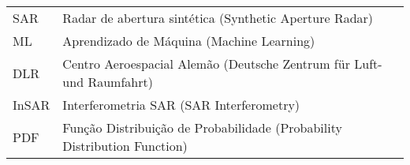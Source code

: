 \begin{longtable}{ll}
SAR	 & 		Radar de abertura sintética (Synthetic Aperture Radar)\\
ML	 & 		Aprendizado de Máquina (Machine Learning)\\
DLR	 & 		Centro Aeroespacial Alemão (Deutsche Zentrum für Luft- und Raumfahrt)\\
InSAR	 & 		Interferometria SAR (SAR Interferometry)\\
PDF	 & 		Função Distribuição de Probabilidade (Probability Distribution Function)\\



\end{longtable}